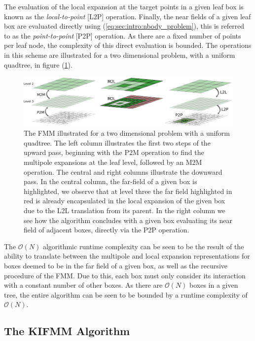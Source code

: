 \documentclass{IEEEcsmag}
\begin{document}
The evaluation of the local expansion at the target points in a given leaf box is known as the \textit{local-to-point} [L2P] operation. Finally, the near fields of a given leaf box are evaluated directly using (\ref{eq:sec:intro:nbody_problem}), this is referred to as the \textit{point-to-point} [P2P] operation. As there are a fixed number of points per leaf node, the complexity of this direct evaluation is bounded. The operations in this scheme are illustrated for a two dimensional problem, with a uniform quadtree, in figure (\ref{fig:tree_traversal}).

\begin{figure}
\centerline{\includegraphics {figures/algorithm.pdf}}
\caption{The FMM illustrated for a two dimensional problem with a uniform quadtree. The left column illustrates the first two steps of the upward pass, beginning with the P2M operation to find the multipole expansions at the leaf level, followed by an M2M operation. The central and right columns illustrate the downward pass. In the central column, the far-field of a given box is highlighted, we observe that at level three the far field highlighted in red is already encapsulated in the local expansion of the given box due to the L2L translation from its parent. In the right column we see how the algorithm concludes with a given box evaluating its near field of adjacent boxes, directly via the P2P operation.}
\label{fig:tree_traversal}
\end{figure}

The $\mathcal{O}(N)$ algorithmic runtime complexity can be seen to be the result of the ability to translate between the multipole and local expansion representations for boxes deemed to be in the far field of a given box, as well as the recursive procedure of the FMM. Due to this, each box must only consider its interaction with a constant number of other boxes. As there are $\mathcal{O}(N)$ boxes in a given tree, the entire algorithm can be seen to be bounded by a runtime complexity of $\mathcal{O}(N)$.

\subsection{The KIFMM Algorithm}
\end{document}
